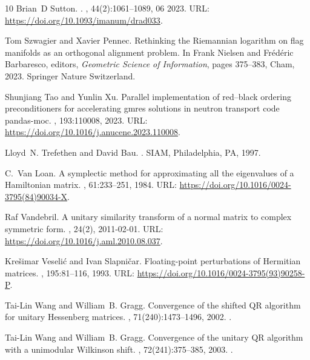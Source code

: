 \documentclass[10pt,twoside,dvipsnames]{siamart1116}
\numberwithin{algorithm}{section}
\numberwithin{equation}{section}
\begin{document}
\begin{thebibliography}{10}
Brian~D Sutton.
.
, 44(2):1061--1089, 06 2023.
\newblock URL: \url{https://doi.org/10.1093/imanum/drad033}.

Tom Szwagier and Xavier Pennec.
\newblock Rethinking the {R}iemannian logarithm on flag manifolds as an
  orthogonal alignment problem.
\newblock In Frank Nielsen and Fr{\'e}d{\'e}ric Barbaresco, editors, {\em
  Geometric Science of Information}, pages 375--383, Cham, 2023. Springer
  Nature Switzerland.

Shunjiang Tao and Yunlin Xu.
\newblock Parallel implementation of red–black ordering preconditioners for
  accelerating gmres solutions in neutron transport code pandas-moc.
, 193:110008, 2023.
\newblock URL: \url{https://doi.org/10.1016/j.anucene.2023.110008}.

Lloyd~N. Trefethen and David Bau.
.
\newblock SIAM, Philadelphia, PA, 1997.

C.~{Van Loan}.
\newblock A symplectic method for approximating all the eigenvalues of a
  {H}amiltonian matrix.
, 61:233--251, 1984.
\newblock URL: \url{https://doi.org/10.1016/0024-3795(84)90034-X}.

Raf Vandebril.
\newblock A unitary similarity transform of a normal matrix to complex
  symmetric form.
, 24(2), 2011-02-01.
\newblock URL: \url{https://doi.org/10.1016/j.aml.2010.08.037}.

Krešimar Veselić and Ivan Slapničar.
\newblock Floating-point perturbations of {H}ermitian matrices.
, 195:81--116, 1993.
\newblock URL: \url{https://doi.org/10.1016/0024-3795(93)90258-P}.

Tai-Lin Wang and William~B. Gragg.
\newblock Convergence of the shifted {QR} algorithm for unitary {H}essenberg
  matrices.
, 71(240):1473--1496, 2002.
\newblock \href {https://arxiv.org/abs/http://www.jstor.org/stable/4099960}
  {}.

Tai-Lin Wang and William~B. Gragg.
\newblock Convergence of the unitary {QR} algorithm with a unimodular
  {W}ilkinson shift.
, 72(241):375--385, 2003.
\newblock \href {https://arxiv.org/abs/http://www.jstor.org/stable/4099996}
  {}.


\end{thebibliography}
\end{document}
